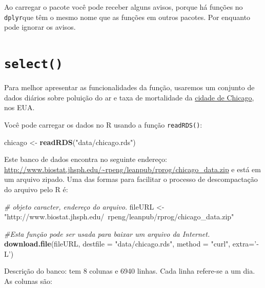 \documentclass[]{book}
\newenvironment{Shaded}{\begin{snugshade}}{\end{snugshade}}
\newcommand{\CommentTok}[1]{\textcolor[rgb]{0.56,0.35,0.01}{\textit{#1}}}
\newcommand{\DataTypeTok}[1]{\textcolor[rgb]{0.13,0.29,0.53}{#1}}
\newcommand{\KeywordTok}[1]{\textcolor[rgb]{0.13,0.29,0.53}{\textbf{#1}}}
\newcommand{\NormalTok}[1]{#1}
\newcommand{\StringTok}[1]{\textcolor[rgb]{0.31,0.60,0.02}{#1}}
\begin{document}
Ao carregar o pacote você pode receber alguns avisos, porque há funções no \texttt{dplyr}que têm o mesmo nome que as funções em outros pacotes. Por enquanto pode ignorar os avisos.

\hypertarget{select}{%
\section{\texorpdfstring{\texttt{select()}}{select()}}\label{select}}

Para melhor apresentar as funcionalidades da função, usaremos um conjunto de dados diários sobre poluição do ar e taxa de mortalidade da \href{http://www.biostat.jhsph.edu/~rpeng/leanpub/rprog/chicago_data.zip}{cidade de Chicago}, nos EUA.

Você pode carregar os dados no R usando a função \texttt{readRDS()}:

\begin{Shaded}
\begin{Highlighting}[]
\NormalTok{chicago <-}\StringTok{ }\KeywordTok{readRDS}\NormalTok{(}\StringTok{"data/chicago.rds"}\NormalTok{)}
\end{Highlighting}
\end{Shaded}

Este banco de dados encontra no seguinte endereço: \url{http://www.biostat.jhsph.edu/~rpeng/leanpub/rprog/chicago_data.zip} e está em um arquivo zipado. Uma das formas para facilitar o processo de descompactação do arquivo pelo R é:

\begin{Shaded}
\begin{Highlighting}[]
\CommentTok{# objeto caracter, endereço do arquivo.}
\NormalTok{fileURL <-}\StringTok{ "http://www.biostat.jhsph.edu/~rpeng/leanpub/rprog/chicago_data.zip"}

\CommentTok{#Esta função pode ser usada para baixar um arquivo da Internet.}
\KeywordTok{download.file}\NormalTok{(fileURL, }\DataTypeTok{destfile =} \StringTok{"data/chicago.rds"}\NormalTok{, }\DataTypeTok{method =} \StringTok{"curl"}\NormalTok{, }\DataTypeTok{extra=}\StringTok{'-L'}\NormalTok{) }
\end{Highlighting}
\end{Shaded}

Descrição do banco: tem 8 colunas e 6940 linhas. Cada linha refere-se a um dia. As colunas são:
\end{document}

